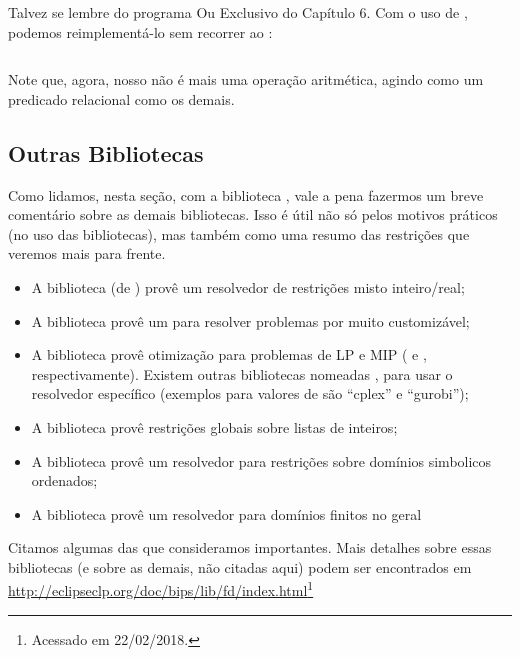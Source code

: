 Talvez se lembre do programa Ou Exclusivo do Capítulo 6. Com o uso de , podemos reimplementá-lo sem recorrer ao :
\vspace{3cm}

\inputminted{prolog}{../Exemplos/Cap8/prog7_xor.pl}

Note que, agora, nosso  não é mais uma operação aritmética, agindo como um predicado relacional como os demais.

\subsection{Outras Bibliotecas}

Como lidamos, nesta seção, com a biblioteca , vale a pena fazermos um breve
comentário sobre as demais bibliotecas. Isso é útil não só pelos motivos práticos (no uso das
bibliotecas), mas também como uma resumo das restrições que veremos mais para frente.

\begin{itemize}
  \item A biblioteca  (de ) provê um resolvedor de restrições misto inteiro/real;
  \item A biblioteca  provê um  para resolver
    problemas por   muito customizável;
  \item A biblioteca  provê otimização para problemas de LP e MIP ( e , respectivamente). Existem outras bibliotecas
  nomeadas , para usar o resolvedor  específico (exemplos para
  valores de  são ``cplex'' e ``gurobi'');
  \item A biblioteca  provê restrições globais sobre listas de inteiros;
  \item A biblioteca  provê um resolvedor para restrições sobre domínios
    simbolicos ordenados;
  \item A biblioteca  provê um resolvedor para domínios finitos no geral
\end{itemize}

Citamos algumas das que consideramos importantes. Mais detalhes sobre essas bibliotecas (e sobre as
demais, não citadas aqui) podem ser encontrados em
\url{http://eclipseclp.org/doc/bips/lib/fd/index.html}\footnote{Acessado em 22/02/2018.}

